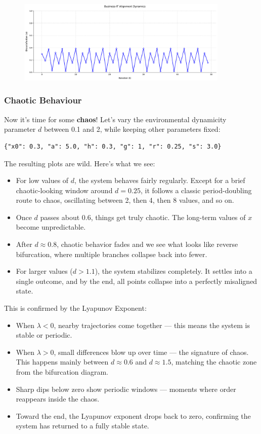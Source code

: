 \documentclass[a4paper, 10pt]{article}
\begin{document}
\begin{figure}[h]
    \centering
    \includegraphics[width=0.9\textwidth]{../images/int-cases/periodic-long-term.pdf}
    \label{fig:periodic-time}
\end{figure}

\subsubsection{Chaotic Behaviour}
Now it's time for some \textbf{chaos}! 
Let's vary the environmental dynamicity parameter $d$ between 0.1 and 2, while keeping other parameters fixed:

\begin{verbatim}
{"x0": 0.3, "a": 5.0, "h": 0.3, "g": 1, "r": 0.25, "s": 3.0}
\end{verbatim}

The resulting plots are wild. Here's what we see:
\begin{itemize}
    \item For low values of $d$, the system behaves fairly regularly. Except for a brief chaotic-looking window around $d=0.25$, it follows a classic period-doubling route to chaos, oscillating between 2, then 4, then 8 values, and so on. 
    \item Once $d$ passes about 0.6, things get truly chaotic. The long-term values of $x$ become unpredictable.
    \item After $d \approx 0.8$, chaotic behavior fades and we see what looks like reverse bifurcation, where multiple branches collapse back into fewer.
    \item For larger values ($d>1.1$), the system stabilizes completely. It settles into a single outcome, and by the end, all points collapse into a perfectly misaligned state.
\end{itemize}

This is confirmed by the Lyapunov Exponent:
\begin{itemize}
    \item When $\lambda<0$, nearby trajectories come together — this means the system is stable or periodic.
    \item When $\lambda>0$, small differences blow up over time — the signature of chaos. This happens mainly between $d \approx 0.6$ and $d \approx 1.5$, matching the chaotic zone from the bifurcation diagram.
    \item Sharp dips below zero show periodic windows — moments where order reappears inside the chaos.
    \item Toward the end, the Lyapunov exponent drops back to zero, confirming the system has returned to a fully stable state.
\end{itemize}
\end{document}
